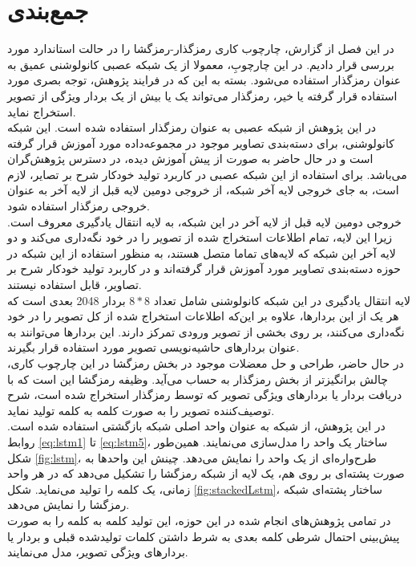 \section{جمع‌بندی}
در این فصل از گزارش، چارچوب کاری رمزگذار-رمزگشا را در حالت استاندارد مورد بررسی قرار دادیم. در این چارچوبِ، معمولا از یک شبکه عصبی کانولوشنی عمیق به عنوان رمزگذار استفاده می‌شود. بسته به این که در فرایند پژوهش، توجه بصری مورد استفاده قرار گرفته یا خیر، رمزگذار می‌تواند یک یا بیش از یک بردار ویژگی از تصویر استخراج نماید.
\\
در این پژوهش از شبکه عصبی  به عنوان رمز‌گذار استفاده شده است. این شبکه کانولوشنی، برای دسته‌بندی تصاویر موجود در مجموعه‌داده  مورد آموزش قرار گرفته است و در حال حاضر به صورت از پیش آموزش دیده، در دسترس پژوهش‌گران می‌باشد. برای استفاده از این شبکه عصبی در کاربرد تولید خودکار شرح بر تصایر، لازم است، به جای خروجی لایه آخر شبکه، از خروجی دومین لایه قبل از لایه آخر به عنوان خروجی رمزگذار استفاده شود.
\\
خروجی دومین لایه قبل از لایه آخر در این شبکه، به لایه انتقال یادگیری معروف است. زیرا این لایه، تمام اطلاعات استخراج شده از تصویر را در خود نگه‌داری می‌کند و دو لایه آخر این شبکه که لایه‌های تماما متصل هستند، به منظور استفاده از این شبکه در حوزه دسته‌بندی تصاویر مورد آموزش قرار گرفته‌اند و در کاربرد تولید خودکار شرح بر تصاویر، قابل استفاده نیستند. 
\\
لایه انتقال یادگیری در این شبکه کانولوشنی شامل تعداد $8*8$ بردار 2048 بعدی است که هر یک از این بردارها، علاوه بر این‌که اطلاعات استخراج شده از کل تصویر را در خود نگه‌داری می‌کنند، بر روی بخشی از تصویر ورودی تمرکز دارند. این بردارها می‌توانند به عنوان بردارهای حاشیه‌نویسی تصویر مورد استفاده قرار بگیرند.
\\
در حال حاضر، طراحی و حل معضلات موجود در بخش رمزگشا در این چارچوب کاری، چالش‌ برانگیزتر از بخش رمزگذار به حساب می‌آید. وظیفه رمزگشا این است که با دریافت بردار یا بردارهای ویژگی تصویر که توسط رمزگذار استخراج شده است، شرح توصیف‌کننده تصویر را به صورت کلمه به کلمه تولید نماید. 
\\
در این پژوهش، از شبکه \lstm به عنوان واحد اصلی شبکه بازگشتی استفاده شده است. روابط \eqref{eq:lstm1} تا \eqref{eq:lstm5}، ساختار یک واحد \lstm را مدل‌سازی می‌نمایند. همین‌طور شکل \ref{fig:lstm}، طرح‌واره‌ای از یک واحد \lstm را نمایش می‌دهد. چینش این واحد‌ها به صورت پشته‌ای بر روی هم، یک لایه از شبکه رمزگشا را تشکیل می‌دهد که در هر واحد زمانی، یک کلمه را تولید می‌نماید. شکل \ref{fig:stackedLstm}، ساختار پشته‌ای شبکه رمزگشا را نمایش می‌دهد.
\\
در تمامی پژوهش‌های انجام شده در این حوزه، این تولید کلمه به کلمه را به صورت پیش‌بینی احتمال شرطی کلمه بعدی به شرط داشتن کلمات تولید‌شده قبلی و بردار یا بردارهای ویژگی تصویر، مدل می‌نمایند.
